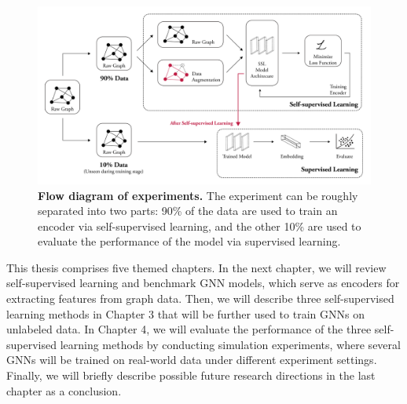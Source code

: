\begin{figure}[!htbp]
\includegraphics[width=\textwidth]{./figures/guide-02.png}
\caption[Flow diagram of experiments]{\textbf{Flow diagram of experiments.}  The experiment can be roughly separated into two parts: 90\% of the data are used to train an encoder via self-supervised learning, and the other 10\% are used to evaluate the performance of the model via supervised learning. }
\label{fig:exp}
\end{figure}


This thesis comprises five themed chapters. In the next chapter, we will review self-supervised learning and benchmark GNN models, which serve as encoders for extracting features from graph data. Then, we will describe three self-supervised learning methods in Chapter 3 that will be further used to train GNNs on unlabeled data. In Chapter 4, we will evaluate the performance of the three self-supervised learning methods by conducting simulation experiments, where several GNNs will be trained on real-world data under different experiment settings. Finally, we will briefly describe possible future research directions in the last chapter as a conclusion.




